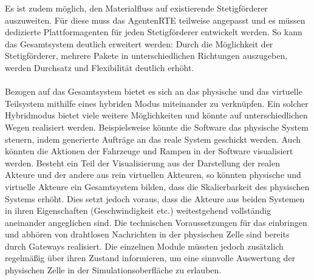 Es ist zudem möglich, den Materialfluss auf existierende Stetigförderer auszuweiten. Für diese muss das AgentenRTE teilweise angepasst und es müssen dedizierte Plattformagenten für jeden Stetigförderer entwickelt werden. So kann das Gesamtsystem deutlich erweitert werden: Durch die Möglichkeit der Stetigförderer, mehrere Pakete in unterschiedlichen Richtungen auszugeben, werden Durchsatz und Flexibilität deutlich erhöht.
\\\\
Bezogen auf das Gesamtsystem bietet es sich an das physische und das virtuelle Teilsystem mithilfe eines hybriden Modus miteinander zu verknüpfen. Ein solcher Hybridmodus bietet viele weitere Möglichkeiten und könnte auf unterschiedlichen Wegen realisiert werden. Beispielsweise könnte die Software das physische System steuern, indem generierte Aufträge an das reale System geschickt werden. Auch könnten die Aktionen der Fahrzeuge und Rampen in der Software visualisiert werden. Besteht ein Teil der Visualisierung aus der Darstellung der realen Akteure und der andere aus rein virtuellen Akteuren, so könnten physische und virtuelle Akteure ein Gesamtsystem bilden, dass die Skalierbarkeit des physischen Systems erhöht. Dies setzt jedoch voraus, dass die Akteure aus beiden Systemen in ihren Eigenschaften (Geschwindigkeit etc.) weitestgehend vollständig aneinander angeglichen sind. Die technischen Voraussetzungen für das einbringen und abhören von drahtlosen Nachrichten in der physischen Zelle sind bereits durch Gateways realisiert. Die einzelnen Module müssten jedoch zusätzlich regelmäßig über ihren Zustand informieren, um eine sinnvolle Auswertung der physischen Zelle in der Simulationsoberfläche zu erlauben.





